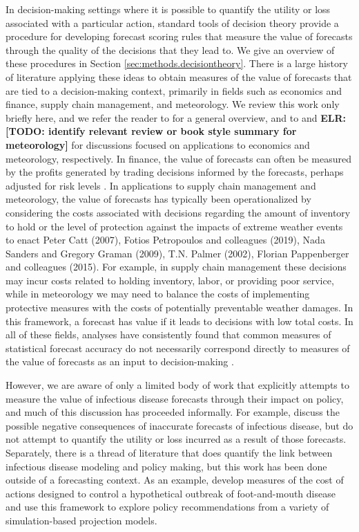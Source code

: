 \documentclass{article}
\def\elr#1{{\color{cyan}\textbf{ELR:[#1]}}}
\begin{document}
In decision-making settings where it is possible to quantify the utility or loss associated with a particular action, standard tools of decision theory provide a procedure for developing forecast scoring rules that measure the value of forecasts through the quality of the decisions that they lead to. We give an overview of these procedures in Section \ref{sec:methods.decisiontheory}. There is a large history of literature applying these ideas to obtain measures of the value of forecasts that are tied to a decision-making context, primarily in fields such as economics and finance, supply chain management, and meteorology. We review this work only briefly here, and we refer the reader to \cite{yardley2021utility_cost_forecasts} for a general overview, and to \cite{pesaran2002decision_based_eval} and \elr{TODO: identify relevant review or book style summary for meteorology} for discussions focused on applications to economics and meteorology, respectively. In finance, the value of forecasts can often be measured by the profits generated by trading decisions informed by the forecasts, perhaps adjusted for risk levels \cite[e.g.,][]{leitch1991economicForecastEval, cenesizoglu2012returnPredictionEconValue}. In applications to supply chain management and meteorology, the value of forecasts has typically been operationalized by considering the costs associated with decisions regarding the amount of inventory to hold or the level of protection against the impacts of extreme weather events to enact {Peter Catt (2007), Fotios Petropoulos and colleagues (2019), Nada Sanders and Gregory Graman (2009), T.N. Palmer (2002), Florian Pappenberger and colleagues (2015)}. For example, in supply chain management these decisions may incur costs related to holding inventory, labor, or providing poor service, while in meteorology we may need to balance the costs of implementing protective measures with the costs of potentially preventable weather damages. In this framework, a forecast has value if it leads to decisions with low total costs. In all of these fields, analyses have consistently found that common measures of statistical forecast accuracy do not necessarily correspond directly to measures of the value of forecasts as an input to decision-making \cite[e.g.,][]{leitch1991economicForecastEval, cenesizoglu2012returnPredictionEconValue}. %

However, we are aware of only a limited body of work that explicitly attempts to measure the value of infectious disease forecasts through their impact on policy, and much of this discussion has proceeded informally. For example, \cite{ioannidis2022forecastingCOVIDfailed} discuss the possible negative consequences of inaccurate forecasts of infectious disease, but do not attempt to quantify the utility or loss incurred as a result of those forecasts. Separately, there is a thread of literature that does quantify the link between infectious disease modeling and policy making, but this work has been done outside of a forecasting context. As an example, \cite{Probert2016decisionMakingFootMouth} develop measures of the cost of actions designed to control a hypothetical outbreak of foot-and-mouth disease and use this framework to explore policy recommendations from a variety of simulation-based projection models.
\end{document}
